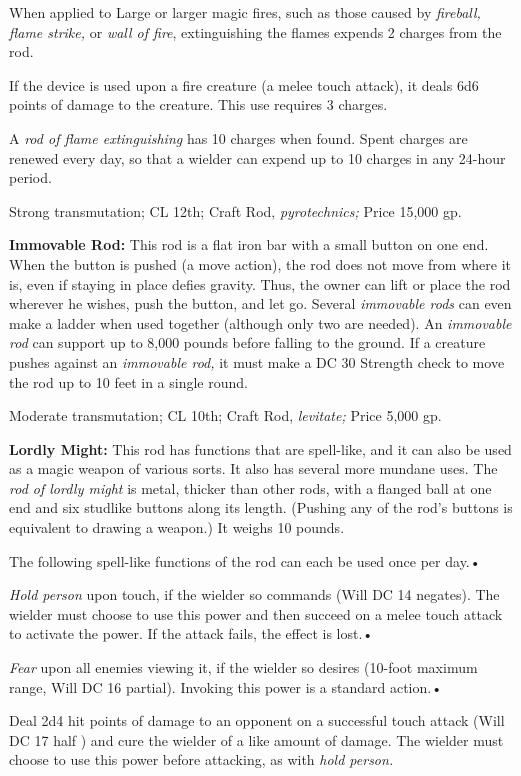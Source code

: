 \documentclass{article}
\begin{document}
When applied to Large or larger magic fires, such as those caused by \textit{fireball, 
flame strike, }or \textit{wall of fire}, extinguishing the flames expends 2 charges 
from the rod.

If the device is used upon a fire creature (a melee touch attack), it deals 6d6 
points of damage to the creature. This use requires 3 charges.

A \textit{rod of flame extinguishing }has 10 charges when found. Spent charges 
are renewed every day, so that a wielder can expend up to 10 charges in any 24-hour 
period.

Strong transmutation; CL 12th; Craft Rod, \textit{pyrotechnics; }Price 15,000 gp.

\textbf{Immovable Rod:} This rod is a flat iron bar with a small button on one 
end. When the button is pushed (a move action), the rod does not move from where 
it is, even if staying in place defies gravity. Thus, the owner can lift or place 
the rod wherever he wishes, push the button, and let go. Several \textit{immovable 
rods }can even make a ladder when used together (although only two are needed). 
An \textit{immovable rod }can support up to 8,000 pounds before falling to the 
ground. If a creature pushes against an \textit{immovable rod, }it must make a 
DC 30 Strength check to move the rod up to 10 feet in a single round.

Moderate transmutation; CL 10th; Craft Rod, \textit{levitate; }Price 5,000 gp.

\textbf{Lordly Might: }This rod has functions that are spell-like, and it can also 
be used as a magic weapon of various sorts. It also has several more mundane uses. 
The \textit{rod of lordly might }is metal, thicker than other rods, with a flanged 
ball at one end and six studlike buttons along its length. (Pushing any of the 
rod's buttons is equivalent to drawing a weapon.) It weighs 10 pounds.

The following spell-like functions of the rod can each be used once per day.• 

\textit{Hold person }upon touch, if the wielder so commands (Will DC 14 negates). 
The wielder must choose to use this power and then succeed on a melee touch attack 
to activate the power. If the attack fails, the effect is lost.• 

\textit{Fear }upon all enemies viewing it, if the wielder so desires (10-foot maximum 
range, Will DC 16 partial). Invoking this power is a standard action.• 

\parindent=3pt
Deal 2d4 hit points of damage to an opponent on a successful touch attack (Will 
DC 17 half ) and cure the wielder of a like amount of damage. The wielder must 
choose to use this power before attacking, as with \textit{hold person.}
\end{document}
